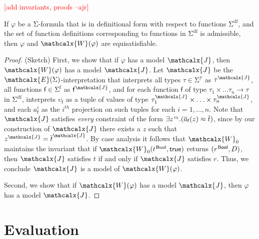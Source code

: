 \documentclass[runningheads,a4paper]{llncs}
\newcommand{\con}[1]{\mathsf{#1}}
\renewcommand\vec[1]{\overline{#1}}
\let\oldSigma=\Sigma
\def\Sigma{\mathrm{\oldSigma}}
\newcommand{\teq}{\approx}
\newcommand{\terms}{\mathcalx{T}}
\newcommand{\vars}{\mathbf{V}}
\newcommand{\M}{\mathcalx{M}}
\newcommand{\I}{\mathcalx{J}} %
\newcommand{\J}{\mathcalx{J}}
\newcommand{\conv}{\mathcalx{W}}
\newcommand{\ssorts}[1]{#1^\mathrm{y}}
\newcommand{\sfuns}[1]{#1^\mathrm{f}}
\newcommand{\sfundefs}[1]{#1^\mathrm{df}}
\newcommand{\ptrue}{\con{true}}
\newcommand{\Bool}{\con{Bool}}
\newcommand{\farg}[1]{a_{#1}}
\newcommand{\vecfarg}[1]{\vec{a}_{#1}}
\newcommand{\fargsort}[1]{\upsilon_{#1}}
\newcommand{\extendsig}[1]{\mathcalx{E}( #1 )}
\newcommand{\rem}[1]{\textcolor{red}{[#1]}}
\newcommand{\ajr}[1]{\rem{#1 --ajr}}
\newcommand{\vthinspace}{\kern+0.083333em}
\newcommand{\typ}[1]{^{\vthinspace #1}}
\begin{document}
\ajr{add invariants, proofs}


\begin{theorem}
If $\varphi$ be a $\Sigma$-formula that is in definitional form with respect to functions $\sfundefs{\Sigma}$,
and the set of function definitions corresponding to functions in $\sfundefs{\Sigma}$ is admissible,
then $\varphi$ and $\conv( \varphi )$ are equisatisfiable.
\end{theorem}
\begin{proof}
(Sketch)  First, we show that if $\varphi$ has a model $\I$, then $\conv( \varphi )$ has a model $\J$.
Let $\J$ be the $\extendsig{\Sigma}$-interpretation that interprets all types $\tau \in \ssorts{\Sigma}$ as $\tau^\I$,
all functions $\con{f} \in \sfuns{\Sigma}$ as $\con{f}^\I$,
and for each function $\con{f}$ of type $\tau_1 \times \ldots \tau_n \rightarrow \tau$ in $\sfundefs{\Sigma}$, 
interprets $\fargsort{\con{f}}$ as a tuple of values of type $\tau_1^\I \times \ldots \times \tau_n^\I$,
and each $\farg{\con{f}}^i$ as the $i^{th}$ projection on such tuples for each $i = 1, \ldots, n$.
Note that $\J$ satisfies \emph{every} constraint of the form $\exists z\typ{\fargsort{\con{f}}}. ( \vecfarg{\con{f}}( z ) \teq \vec t )$,
since by our construction of $\J$ there exists a $z$ such that $z^\J = \vec t^\J$.
By case analysis it follows that $\conv_0$ maintains the invariant that
if $\conv_0( t\typ{\Bool}, \ptrue )$ returns $( r\typ{\Bool}, D )$,
then $\I$ satisfies $t$ if and only if $\J$ satisfies $r$.
Thus, we conclude $\J$ is a model of $\conv( \varphi )$.

Second, we show that if $\conv( \varphi )$ has a model $\I$, then $\varphi$ has a model $\J$.

\end{proof}

\section{Evaluation}
\label{sec:evaluation}
\end{document}
